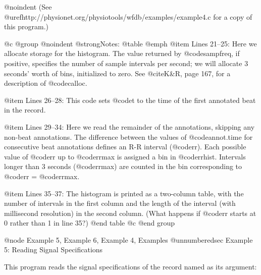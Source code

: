 {{{{{{{{{@noindent
(See @uref{http://physionet.org/physiotools/wfdb/examples/example4.c}
for a copy of this program.)

@c @group
@noindent
@strong{Notes:}
@table @emph
@item Lines 21--25:
Here we allocate storage for the histogram.  The value returned by
@code{sampfreq}, if positive, specifies the number of sample intervals
per second; we will allocate 3 seconds' worth of bins, initialized to
zero.  See @cite{K&R}, page 167, for a description of
@code{calloc}.

@item Lines 26--28:
This code sets @code{t} to the time of the first annotated beat in the
record.

@item Lines 29--34:
Here we read the remainder of the annotations, skipping any non-beat
annotations.  The difference between the values of @code{annot.time} for
consecutive beat annotations defines an R-R interval (@code{rr}).  Each
possible value of @code{rr} up to @code{rrmax} is assigned a bin in
@code{rrhist}.  Intervals longer than 3 seconds (@code{rrmax}) are
counted in the bin corresponding to @code{rr} = @code{rrmax}.

@item Lines 35--37:
The histogram is printed as a two-column table, with the number of
intervals in the first column and the length of the interval (with
millisecond resolution) in the second column. (What happens if
@code{rr} starts at 0 rather than 1 in line 35?)
@end table
@c @end group

@node     Example 5, Example 6, Example 4, Examples
@unnumberedsec Example 5: Reading Signal Specifications

This program reads the signal specifications of the record named as its
argument:

}}}}}}}}}
